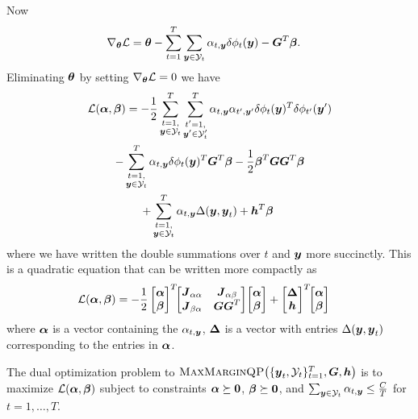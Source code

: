 \documentclass[10pt,journal,letterpaper,compsoc]{IEEEtran}
\newcommand{\mmqp}[3]{\textrm{\sc MaxMarginQP}\!\left(\{\by_t, #1\}_{t=1}^{T}, #2, #3\right)}
\numberwithin{equation}{section}
\begin{document}
Now
\begin{align}
\nabla_{\btheta} \Ell 
&= \btheta - \sum_{t=1}^T \sum_{\by \in \Y_t} \alpha_{t,\by} \delta\phi_t(\by) - \bG^T\bbeta.
\end{align}
%
Eliminating $\boldsymbol{\theta}$ by setting $\nabla_{\btheta} \Ell = 0$ we have
%
\begin{multline}
  \Ell(\balpha, \bbeta) =
  -\frac{1}{2} \sum_{\substack{t=1,\\\by \in \Y_t}}^{T} \sum_{\substack{t'=1,\\\by' \in \Y_t'}}^{T}
  \alpha_{t, \by} \alpha_{t', \by'} \delta\phi_t(\by)^T \delta\phi_{t'}(\by') \\
  - \sum_{\substack{t=1,\\\by \in \Y_t}}^{T} \alpha_{t, \by} \delta\phi_t(\by)^T \bG^T \bbeta
  -\frac{1}{2} \bbeta^T \bG \bG^T \bbeta \\
  + \sum_{\substack{t=1,\\\by \in \Y_t}}^{T} \alpha_{t, \by} \Delta(\by, \by_t) + \bh^T \bbeta\
  \label{eqn:lagrangian3}
\end{multline}
%
where we have written the double summations over $t$ and ${\boldsymbol{y}}$ more
succinctly. This is a quadratic equation that can be written more
compactly as
%
\begin{align}
  \Ell(\balpha, \bbeta) &=
  -\frac{1}{2} \begin{bmatrix}\balpha \\ \bbeta \end{bmatrix}^T 
  \!\! \begin{bmatrix}\bJ_{\alpha\alpha} & \bJ_{\alpha\beta} \\ \bJ_{\beta\alpha} & \bG\bG^T \end{bmatrix}
  \! \begin{bmatrix}\balpha \\ \bbeta \end{bmatrix} +
  \begin{bmatrix} \bDelta \\ \bh \end{bmatrix}^T \!\! \begin{bmatrix}\balpha \\ \bbeta \end{bmatrix}
  \label{eqn:lagrangian_matrix}
\end{align}
%
where $\boldsymbol{\alpha}$ is a vector containing the $\alpha_{t,{\boldsymbol{y}}}$, $\boldsymbol{\Delta}$
is a vector with entries $\Delta({\boldsymbol{y}}, {\boldsymbol{y}}_t)$ corresponding to the
entries in $\boldsymbol{\alpha}$.

The dual optimization problem to $\mmqp{\Y_t}{\bG}{\bh}$ is to
maximize $\Ell(\balpha, \bbeta)$ subject to constraints $\boldsymbol{\alpha}
\succeq \textbf{0}$, $\boldsymbol{\beta} \succeq \textbf{0}$, and $\sum_{\by \in \Y_t}
\alpha_{t,\by} \leq \frac{C}{T}$ for $t = 1, \ldots, T$.
\end{document}

